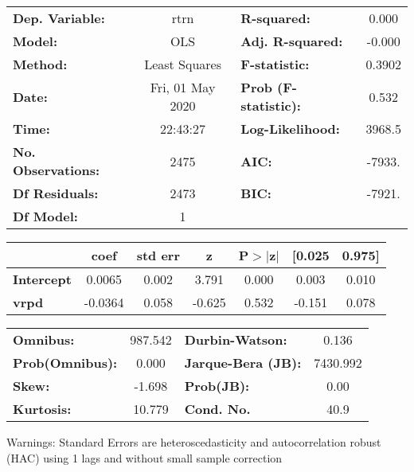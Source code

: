 \begin{center}
\begin{tabular}{lclc}
\toprule
\textbf{Dep. Variable:}    &       rtrn       & \textbf{  R-squared:         } &     0.000   \\
\textbf{Model:}            &       OLS        & \textbf{  Adj. R-squared:    } &    -0.000   \\
\textbf{Method:}           &  Least Squares   & \textbf{  F-statistic:       } &    0.3902   \\
\textbf{Date:}             & Fri, 01 May 2020 & \textbf{  Prob (F-statistic):} &    0.532    \\
\textbf{Time:}             &     22:43:27     & \textbf{  Log-Likelihood:    } &    3968.5   \\
\textbf{No. Observations:} &        2475      & \textbf{  AIC:               } &    -7933.   \\
\textbf{Df Residuals:}     &        2473      & \textbf{  BIC:               } &    -7921.   \\
\textbf{Df Model:}         &           1      & \textbf{                     } &             \\
\bottomrule
\end{tabular}
\begin{tabular}{lcccccc}
                   & \textbf{coef} & \textbf{std err} & \textbf{z} & \textbf{P$> |$z$|$} & \textbf{[0.025} & \textbf{0.975]}  \\
\midrule
\textbf{Intercept} &       0.0065  &        0.002     &     3.791  &         0.000        &        0.003    &        0.010     \\
\textbf{vrpd}      &      -0.0364  &        0.058     &    -0.625  &         0.532        &       -0.151    &        0.078     \\
\bottomrule
\end{tabular}
\begin{tabular}{lclc}
\textbf{Omnibus:}       & 987.542 & \textbf{  Durbin-Watson:     } &    0.136  \\
\textbf{Prob(Omnibus):} &   0.000 & \textbf{  Jarque-Bera (JB):  } & 7430.992  \\
\textbf{Skew:}          &  -1.698 & \textbf{  Prob(JB):          } &     0.00  \\
\textbf{Kurtosis:}      &  10.779 & \textbf{  Cond. No.          } &     40.9  \\
\bottomrule
\end{tabular}
\end{center}

Warnings: \newline
 [1] Standard Errors are heteroscedasticity and autocorrelation robust (HAC) using 1 lags and without small sample correction